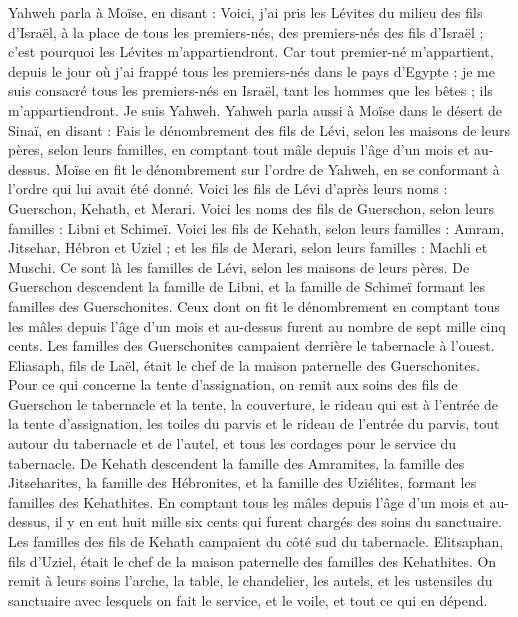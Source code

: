 \begin{multicols}{2}
Yahweh parla à Moïse, en disant :
Voici, j'ai pris les Lévites du milieu des fils d'Israël, à la place de tous les premiers-nés, des premiers-nés des fils d'Israël ; c'est pourquoi les Lévites m’appartiendront.
Car tout premier-né m'appartient, depuis le jour où j’ai frappé tous les premiers-nés dans le pays d'Egypte ; je me suis consacré tous les premiers-nés en Israël, tant les hommes que les bêtes ; ils m’appartiendront. Je suis Yahweh.
Yahweh parla aussi à Moïse dans le désert de Sinaï, en disant :
Fais le dénombrement des fils de Lévi, selon les maisons de leurs pères, selon leurs familles, en comptant tout mâle depuis l'âge d'un mois et au-dessus.
Moïse en fit le dénombrement sur l’ordre de Yahweh, en se conformant à l’ordre qui lui avait été donné.
Voici les fils de Lévi d’après leurs noms : Guerschon, Kehath, et Merari.
Voici les noms des fils de Guerschon, selon leurs familles : Libni et Schimeï.
Voici les fils de Kehath, selon leurs familles : Amram, Jitsehar, Hébron et Uziel ;
et les fils de Merari, selon leurs familles : Machli et Muschi. Ce sont là les familles de Lévi, selon les maisons de leurs pères.
De Guerschon descendent la famille de Libni, et la famille de Schimeï formant les familles des Guerschonites.
Ceux dont on fit le dénombrement en comptant tous les mâles depuis l'âge d'un mois et au-dessus furent au nombre de sept mille cinq cents.
Les familles des Guerschonites campaient derrière le tabernacle à l'ouest.
Eliasaph, fils de Laël, était le chef de la maison paternelle des Guerschonites.
Pour ce qui concerne la tente d’assignation, on remit aux soins des fils de Guerschon le tabernacle et la tente, la couverture, le rideau qui est à l'entrée de la tente d'assignation,
les toiles du parvis et le rideau de l'entrée du parvis, tout autour du tabernacle et de l'autel, et tous les cordages pour le service du tabernacle.
De Kehath descendent la famille des Amramites, la famille des Jitseharites, la famille des Hébronites, et la famille des Uziélites, formant les familles des Kehathites.
En comptant tous les mâles depuis l'âge d'un mois et au-dessus, il y en eut huit mille six cents qui furent chargés des soins du sanctuaire.
Les familles des fils de Kehath campaient du côté sud du tabernacle.
Elitsaphan, fils d’Uziel, était le chef de la maison paternelle des familles des Kehathites.
On remit à leurs soins l'arche, la table, le chandelier, les autels, et les ustensiles du sanctuaire avec lesquels on fait le service, et le voile, et tout ce qui en dépend.

\end{multicols}
